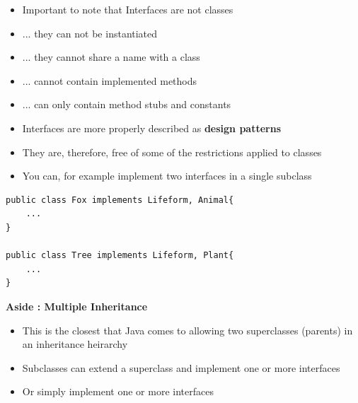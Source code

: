 \documentclass{beamer}
\begin{document}
\begin{frame}
\begin{itemize}
\item Important to note that Interfaces are not classes
\item ... they can not be instantiated 
\item ... they cannot share a name with a class
\item ... cannot contain implemented methods 
\item ... can only contain method stubs and constants
\end{itemize}
\end{frame}

\begin{frame}
\begin{itemize}
\item Interfaces are more properly described as \textbf{design patterns}
\item They are, therefore, free of some of the restrictions applied to classes
\item You can, for example implement two interfaces in a single subclass
\end{itemize}
\end{frame}

\begin{frame}[fragile]
\begin{block}{}
\begin{lstlisting}
public class Fox implements Lifeform, Animal{
    ...
}

public class Tree implements Lifeform, Plant{
    ...
}
\end{lstlisting}
\end{block}
\end{frame}

\begin{frame}
\begin{center}
\textbf{Aside : Multiple Inheritance}
\end{center}
\begin{itemize}
\item This is the closest that Java comes to allowing two superclasses (parents) in an inheritance heirarchy
\bigskip
\item Subclasses can extend a superclass and implement one or more interfaces
\item Or simply implement one or more interfaces
\end{itemize}
\end{frame}
\end{document}
